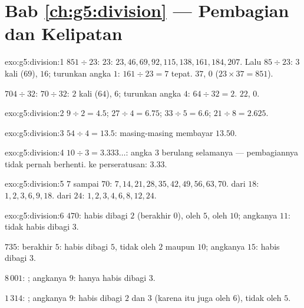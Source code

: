 \section*{Bab \ref{ch:g5:division} --- Pembagian dan Kelipatan}

\begin{solution}{exo:g5:division:1}
$851 \div 23$:  $23$: $23, 46, 69, 92, 115, 138, 161,
184, 207$. Lalu $85 \div 23$: $3$ kali ($69$),  $16$;
turunkan angka $1$: $161 \div 23 = 7$ tepat.  $37$,
 $0$ ($23 \times 37 = 851$).

$704 \div 32$: $70 \div 32$: $2$ kali ($64$),  $6$; turunkan
angka $4$: $64 \div 32 = 2$.  $22$,  $0$.
\end{solution}

\begin{solution}{exo:g5:division:2}
$9 \div 2 = 4.5$; \quad $27 \div 4 = 6.75$; \quad
$33 \div 5 = 6.6$; \quad $21 \div 8 = 2.625$.
\end{solution}

\begin{solution}{exo:g5:division:3}
$54 \div 4 = 13.5$: masing-masing membayar $13.50$.
\end{solution}

\begin{solution}{exo:g5:division:4}
$10 \div 3 = 3.333\dots$: angka $3$ berulang selamanya ---
pembagiannya tidak pernah berhenti.  ke perseratusan: $3.33$.
\end{solution}

\begin{solution}{exo:g5:division:5}
 $7$ sampai $70$: $7, 14, 21, 28, 35, 42, 49, 56, 63,
70$.  dari $18$: $1, 2, 3, 6, 9, 18$.  dari $24$:
$1, 2, 3, 4, 6, 8, 12, 24$.
\end{solution}

\begin{solution}{exo:g5:division:6}
$470$: habis dibagi $2$ (berakhir $0$), oleh $5$, oleh $10$; 
angkanya $11$: tidak habis dibagi $3$.

$735$: berakhir $5$: habis dibagi $5$, tidak oleh $2$ maupun $10$;
 angkanya $15$: habis dibagi $3$.

$8\,001$: ;  angkanya $9$: hanya habis dibagi $3$.

$1\,314$: ;  angkanya $9$: habis dibagi $2$ dan $3$
(karena itu juga oleh $6$), tidak oleh $5$.
\end{solution}

